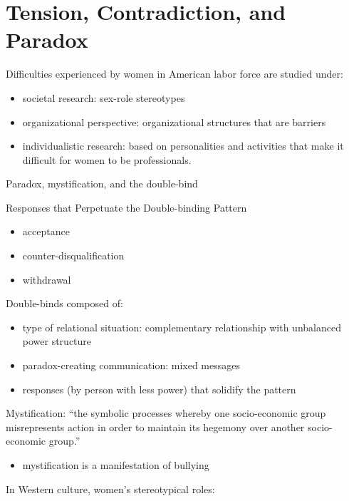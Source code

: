 \documentclass[
]{book}
\providecommand{\tightlist}{%
  \setlength{\itemsep}{0pt}\setlength{\parskip}{0pt}}
\begin{document}
\hypertarget{tension-contradiction-and-paradox}{%
\chapter{Tension, Contradiction, and Paradox}\label{tension-contradiction-and-paradox}}

\citep{Wood_1983}

Difficulties experienced by women in American labor force are studied
under:

\begin{itemize}
\item
  societal research: sex-role stereotypes
\item
  organizational perspective: organizational structures that are
  barriers
\item
  individualistic research: based on personalities and activities that
  make it difficult for women to be professionals.
\end{itemize}

Paradox, mystification, and the double-bind

Responses that Perpetuate the Double-binding Pattern

\begin{itemize}
\item
  acceptance
\item
  counter-disqualification
\item
  withdrawal
\end{itemize}

Double-binds composed of:

\begin{itemize}
\item
  type of relational situation: complementary relationship with
  unbalanced power structure
\item
  paradox-creating communication: mixed messages
\item
  responses (by person with less power) that solidify the pattern
\end{itemize}

Mystification: ``the symbolic processes whereby one socio-economic group
misrepresents action in order to maintain its hegemony over another
socio-economic group.''

\begin{itemize}
\tightlist
\item
  mystification is a manifestation of bullying
\end{itemize}

In Western culture, women's stereotypical roles:
\end{document}
